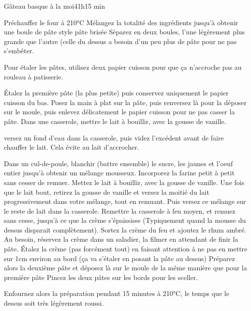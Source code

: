 {\begin{recette}{Gâteau basque à la moi}{4}{1h}{15 min}
\begin{preparation}
\etape Préchauffer le four à 210°C
\etape Mélangez la totalité des ingrédients jusqu'à obtenir une boule de pâte style pâte brisée
\etape Séparez en deux boules, l'une légèrement plus grande que l'autre (celle du dessus a besoin d'un peu plus de pâte pour ne 
pas s'embêter.
\begin{remarque}
Pour étaler les pâtes, utilisez deux papier cuisson pour que ça n'accroche pas au rouleau à patisserie.\end{remarque}
\etape  Étalez la première pâte (la plus petite) puis conservez uniquement le papier cuisson du bas. Posez la main à plat sur la pâte, puis renversez là pour la déposer sur le moule, puis enlevez délicatement le papier cuisson pour ne pas casser la pâte.
\etape Dans une casserole, mettre le lait à bouillir, avec la gousse de vanille. 
\begin{remarque}
versez un fond d’eau dans la casserole, puis videz l’excédent avant de faire chauffer le lait. Cela évite au lait d’accrocher.
\end{remarque}
\etape Dans un cul-de-poule, blanchir (battre ensemble) le sucre, les jaunes et l’oeuf entier jusqu’à obtenir un mélange mousseux.
\etape Incorporez la farine petit à petit sans cesser de remuer.
\etape Mettez le lait à bouillir, avec la gousse de vanille. Une fois que le lait bout, retirez la gousse de vanille et versez la moitié du lait progressivement dans votre mélange, tout en remuant.
\etape Puis versez ce mélange sur le reste de lait dans la casserole. Remettre la casserole à feu moyen, et remuez sans cesse, jusqu’à ce que la crème s’épaississe (Typiquement quand la mousse du dessus disparait complètement).
\etape Sortez la crème du feu et ajoutez le rhum ambré.
\etape Au besoin, réservez la crème dans un saladier, la filmer en attendant de finir la pâte.
\etape Étalez la crème (pas forcément tout) en faisant attention à ne pas en mettre sur 1cm environ au bord (ça va s'étaler en posant la pâte au dessus)
\etape Préparez alors la deuxième pâte et déposez là sur le moule de la même manière que pour la première pâte
\etape Pincez les deux pâtes sur les bords pour les sceller.

\end{preparation}

\begin{cuisson}
Enfournez alors la préparation pendant 15 minutes à 210°C, le temps que le dessus soit très légèrement roussi.
\end{cuisson}
\end{recette}

}
